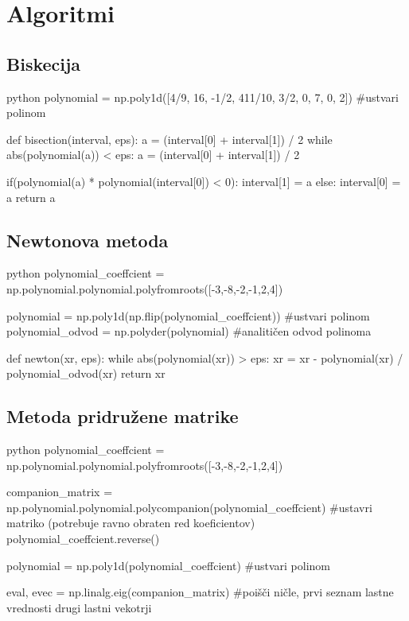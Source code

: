 \appendix

\chapter{Algoritmi}
\section*{Biskecija}
\begin{mintedbox}{python}
polynomial = np.poly1d([4/9, 16, -1/2, 411/10, 3/2, 0, 7, 0, 2]) #ustvari polinom

def bisection(interval, eps):
    a = (interval[0] + interval[1]) / 2
    while abs(polynomial(a)) < eps:
        a = (interval[0] + interval[1]) / 2
        
        if(polynomial(a) * polynomial(interval[0]) < 0):
            interval[1] = a
        else:
            interval[0] = a
    return a

\end{mintedbox}

\section*{Newtonova metoda}

\begin{mintedbox}{python}
polynomial_coeffcient = np.polynomial.polynomial.polyfromroots([-3,-8,-2,-1,2,4])


polynomial = np.poly1d(np.flip(polynomial_coeffcient)) #ustvari polinom
polynomial_odvod = np.polyder(polynomial) #analitičen odvod polinoma

def newton(xr, eps):
    while abs(polynomial(xr)) > eps:
        xr = xr - polynomial(xr) / polynomial_odvod(xr)
    return xr
\end{mintedbox}
\section*{Metoda pridružene matrike}

\begin{mintedbox}{python}
polynomial_coeffcient = np.polynomial.polynomial.polyfromroots([-3,-8,-2,-1,2,4])

companion_matrix = np.polynomial.polynomial.polycompanion(polynomial_coeffcient) #ustavri matriko (potrebuje ravno obraten red koeficientov)
polynomial_coeffcient.reverse()

polynomial = np.poly1d(polynomial_coeffcient) #ustvari polinom


eval, evec = np.linalg.eig(companion_matrix) #poišči ničle, prvi seznam lastne vrednosti drugi lastni vekotrji
\end{mintedbox}
